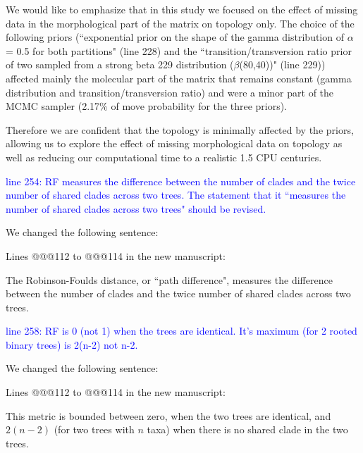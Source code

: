 \documentclass[11pt]{letter}
\begin{document}
\begin{letter}{}
We would like to emphasize that in this study we focused on the effect of missing data in the morphological part of the matrix on topology only. The choice of the following priors (``exponential prior on the shape of the gamma distribution of $\alpha$ = 0.5 for both partitions" (line 228) and the ``transition/transversion ratio prior of two sampled from a strong beta 229 distribution ($\beta$(80,40))" (line 229)) affected mainly the molecular part of the matrix that remains constant (gamma distribution and transition/transversion ratio) and were a minor part of the MCMC sampler (2.17\% of move probability%
 for the three priors). 


 Therefore we are confident that the topology is minimally affected by the priors, allowing us to explore the effect of missing morphological data on topology as well as reducing our computational time to a realistic 1.5 CPU centuries.



\textcolor{blue}{line 254: RF measures the difference between the number of clades and the twice number of shared clades across two trees. The statement that it ``measures the number of shared clades across two trees" should be revised.}

We changed the following sentence: %

Lines @@@112 to @@@114 in the new manuscript:

\hfill\begin{minipage}{\dimexpr\textwidth-1cm}
The Robinson-Foulds distance, or ``path difference", measures the difference between the number of clades and the twice number of shared clades across two trees.
\end{minipage}


\textcolor{blue}{line 258: RF is 0 (not 1) when the trees are identical. It's maximum (for 2 rooted binary trees) is 2(n-2) not n-2.}

We changed the following sentence:

Lines @@@112 to @@@114 in the new manuscript:

\hfill\begin{minipage}{\dimexpr\textwidth-1cm}
This metric is bounded between zero, when the two trees are identical, and $2(n-2)$ (for two trees with $n$ taxa) when there is no shared clade in the two trees.
\end{minipage}


\end{letter}
\end{document}
